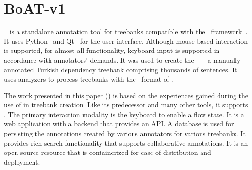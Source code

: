 \section{BoAT-v1}
\label{sec:boatvone}

\boatvone~\cite{turk-etal-2019-turkish} is a standalone annotation tool for treebanks compatible with the \ud\ framework~\cite{UD}.
It uses Python~\cite{python} and Qt~\cite{qt} for the user interface.
Although mouse-based interaction is supported, for almost all functionality, keyboard input is supported in accordance with annotators' demands.
It was used to create the \bountreebank~\cite{turk-etal-2019-turkish,turk2021resources,UD-Boun-Treebank} -- a manually annotated Turkish dependency treebank comprising thousands of sentences.
It uses analyzers to process treebanks with the \conllu\ format of \ud.

The work presented in this paper (\boatvtwo) is based on the experiences gained during the use of \boatvone in treebank creation.
Like its predecessor and many other tools, it supports \ud.
The primary interaction modality is the keyboard to enable a flow state.
It is a web application with a backend that provides an API.
A database is used for persisting the annotations created by various annotators for various treebanks.
It provides rich search functionality that supports collaborative annotations.
It is an open-source resource that is containerized for ease of distribution and deployment.
